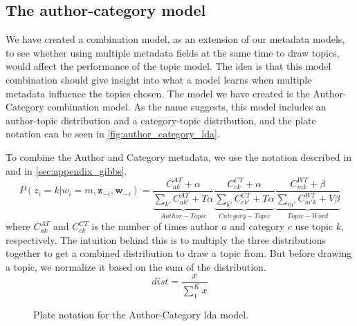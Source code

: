 \subsection{The author-category model}\label{sec:combination}
We have created a combination model, as an extension of our metadata models, to see whether using multiple metadata fields at the same time to draw topics, would affect the performance of the topic model.
The idea is that this model combination should give insight into what a model learns when multiple metadata influence the topics chosen.
The model we have created is the Author-Category combination model.
As the name suggests, this model includes an author-topic distribution and a category-topic distribution, and the plate notation can be seen in \autoref{fig:author_category_lda}.

To combine the Author and Category metadata, we use the notation described in \citet{author_topic_2012} and in \ref{sec:appendix_gibbs}.
\begin{equation}
		P(z_i = k |w_i = m, \boldsymbol{z}_{-i}, \boldsymbol{w}_{-i}) = 
	\underbrace{\frac{C^{AT}_{ak} + \alpha}{\sum_{k'} C^{AT}_{ak'} + T\alpha}}_{Author-Topic}
	\underbrace{\frac{C^{CT}_{ck} + \alpha}{\sum_{k'} C^{CT}_{ck'} + T\alpha}}_{Category-Topic}
	\underbrace{\frac{C^{WT}_{mk} + \beta}{\sum_{m'} C^{WT}_{m'k} + V\beta}}_{Topic-Word}
\end{equation}
where $C^{AT}_{ak}$ and $C^{CT}_{ck}$ is the number of times author $a$ and category $c$ use topic $k$, respectively.
The intuition behind this is to multiply the three distributions together to get a combined distribution to draw a topic from.
But before drawing a topic, we normalize it based on the sum of the distribution.
\begin{equation}
	dist = \frac{x}{\sum_{1}^{K} x}
\end{equation}

\begin{figure*}[ht]
	\centering
	\resizebox{.3\textwidth}{!}{%
		
	}
	\caption{Plate notation for the Author-Category \gls{lda} model.}
	\label{fig:author_category_lda}
\end{figure*}




